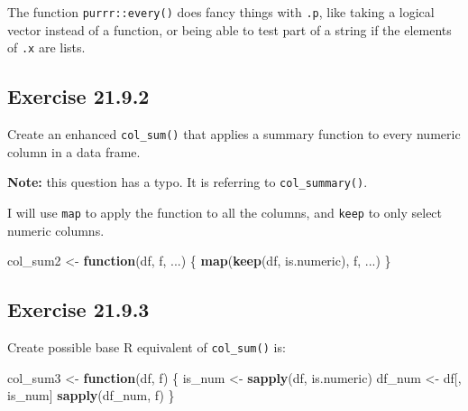 \documentclass[]{book}
\newenvironment{Shaded}{\begin{snugshade}}{\end{snugshade}}
\newcommand{\CommentTok}[1]{\textcolor[rgb]{0.56,0.35,0.01}{\textit{#1}}}
\newcommand{\ControlFlowTok}[1]{\textcolor[rgb]{0.13,0.29,0.53}{\textbf{#1}}}
\newcommand{\KeywordTok}[1]{\textcolor[rgb]{0.13,0.29,0.53}{\textbf{#1}}}
\newcommand{\NormalTok}[1]{#1}
\newcommand{\StringTok}[1]{\textcolor[rgb]{0.31,0.60,0.02}{#1}}
\theoremstyle{plain}
\theoremstyle{remark}
\begin{document}
The function \texttt{purrr::every()} does fancy things with \texttt{.p},
like taking a logical vector instead of a function, or being able to
test part of a string if the elements of \texttt{.x} are lists.

\hypertarget{exercise-21.9.2}{%
\subsection*{\texorpdfstring{Exercise
{21.9.2}}{Exercise 21.9.2}}\label{exercise-21.9.2}}

Create an enhanced \texttt{col\_sum()} that applies a summary function
to every numeric column in a data frame.

\textbf{Note:} this question has a typo. It is referring to
\texttt{col\_summary()}.

I will use \texttt{map} to apply the function to all the columns, and
\texttt{keep} to only select numeric columns.

\begin{Shaded}
\begin{Highlighting}[]
\NormalTok{col_sum2 <-}\StringTok{ }\ControlFlowTok{function}\NormalTok{(df, f, ...) \{}
  \KeywordTok{map}\NormalTok{(}\KeywordTok{keep}\NormalTok{(df, is.numeric), f, ...)}
\NormalTok{\}}
\end{Highlighting}
\end{Shaded}

\begin{Shaded}
\end{Shaded}

\hypertarget{exercise-21.9.3}{%
\subsection*{\texorpdfstring{Exercise
{21.9.3}}{Exercise 21.9.3}}\label{exercise-21.9.3}}

Create possible base R equivalent of \texttt{col\_sum()} is:

\begin{Shaded}
\begin{Highlighting}[]
\NormalTok{col_sum3 <-}\StringTok{ }\ControlFlowTok{function}\NormalTok{(df, f) \{}
\NormalTok{  is_num <-}\StringTok{ }\KeywordTok{sapply}\NormalTok{(df, is.numeric)}
\NormalTok{  df_num <-}\StringTok{ }\NormalTok{df[, is_num]}
  \KeywordTok{sapply}\NormalTok{(df_num, f)}
\NormalTok{\}}
\end{Highlighting}
\end{Shaded}
\end{document}

